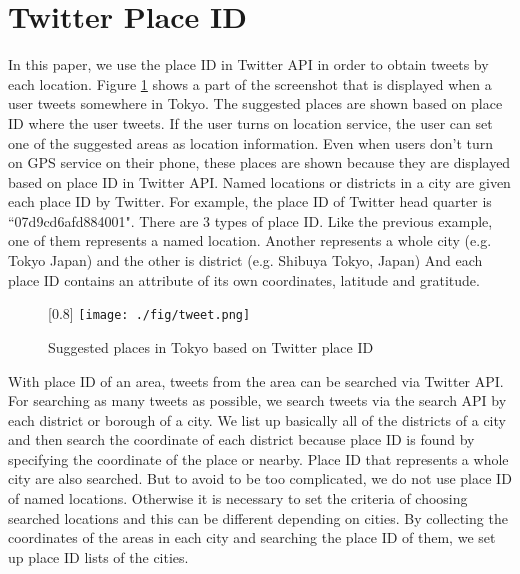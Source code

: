 \documentclass[twocolumn]{article}
\begin{document}
\vspace{-6mm}

\section{Twitter Place ID}\label{sec:placeid}
\vspace{-2mm}
In this paper, we use the place ID in Twitter API \cite{twitter_api_placeid} in order to obtain tweets by each location. 
Figure \ref{fig:tweet} shows a part of the screenshot that is displayed when a user tweets somewhere in Tokyo.
The suggested places are shown based on place ID where the user tweets.
If the user turns on location service, the user can set one of the suggested areas as location information. 
Even when users don't turn on GPS service on their phone, these places are shown because they are displayed based on place ID in Twitter API.
Named locations or districts in a city are given each place ID by Twitter.
For example, the place ID of Twitter head quarter is ``07d9cd6afd884001".
There are 3 types of place ID.
Like the previous example, one of them represents a named location.
Another represents a whole city (e.g. Tokyo Japan) and the other is district (e.g. Shibuya Tokyo, Japan)
And each place ID contains an attribute of its own coordinates, latitude and gratitude.

\begin{figure}
	\centering
	\scalebox{0.7}[0.8]{
	\texttt{[image: ./fig/tweet.png]}
	}
	\caption{Suggested places in Tokyo based on Twitter place ID}
	\label{fig:tweet}
\end{figure}

With place ID of an area, tweets from the area can be searched via Twitter API.
For searching as many tweets as possible, we search tweets via the search API by each district or borough of a city.
We list up basically all of the districts of a city and then search the coordinate of each district because place ID is found by specifying the coordinate of the place or nearby.
Place ID that represents a whole city are also searched.
But to avoid to be too complicated, we do not use place ID of named locations.
Otherwise it is necessary to set the criteria of choosing searched locations and this can be different depending on cities.
By collecting the coordinates of the areas in each city and searching the place ID of them, we set up place ID lists of the cities.
\end{document}
